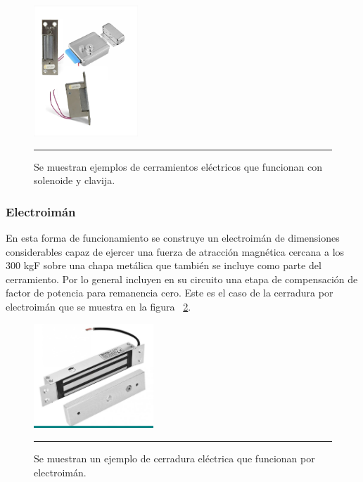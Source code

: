 \begin{figure}[htbp]
	\centering
	\includegraphics[width=0.35\textwidth]{Pictures/sol+clav.png}
	\rule{35em}{1pt}
	\caption[Cerramientos de perno]{Se muestran ejemplos de cerramientos eléctricos que funcionan con solenoide y clavija. }
	\label{fig:sol+clav}
\end{figure}

\subsubsection{Electroimán}
En esta forma de funcionamiento se construye un electroimán de dimensiones considerables capaz de ejercer una fuerza de atracción magnética cercana a los 300 kgF sobre una chapa metálica que también se incluye como parte del cerramiento. Por lo general incluyen en su circuito una etapa de compensación de factor de potencia para remanencia cero.
Este es el caso de la cerradura por electroimán que se muestra en la figura ~\ref{fig:cerr-mag}.

\begin{figure}[htbp]
	\centering
	\includegraphics[width=0.4\textwidth]{Pictures/magnet.png}
	\rule{35em}{1pt}
	\caption[Cerradura Electroimán]{Se muestran un ejemplo de cerradura eléctrica que funcionan por electroimán. }
	\label{fig:cerr-mag}
\end{figure}

